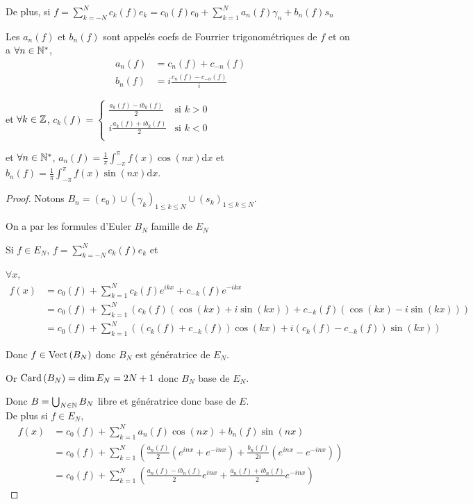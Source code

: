 De plus, si $\displaystyle f = \sum_{k = -N }^{N } c_k(f) e_k = c_0(f)e_0 + \sum_{k=1}^N a_n(f) \gamma_n + b_n(f) s_n$

Les $a_n(f)$ et $b_n(f)$ sont appelés coefs de Fourrier trigonométriques de $f$ et on a 
$\forall n \in \mathbb{N}^*$,
\begin{align}
    a_n(f) & = c_n(f) + c_{-n}(f) \\
    b_n(f) & = i \frac{c_n(f) - c_{-n}(f)} i
\end{align}

et $\forall k \in \mathbb{Z}$, $c_k(f) = \left\{ \begin{matrix}
    \frac{a_k(f) - ib_k(f)}{2} & \text{si } k > 0 \\
    i \frac{a_k(f) + ib_k(f) }{2 } & \text{si } k < 0 \\
\end{matrix} \right.$

et $\forall n \in \mathbb{N}^*$, $a_n(f) = \frac 1 \pi \int_{- \pi }^\pi f(x) \cos(nx) \mathrm{d}x$ et
$b_n(f) = \frac 1 \pi \int_{- \pi }^\pi f(x) \sin(nx) \mathrm{d}x$.

\begin{proof}
    Notons $B_n = (e_0) \cup (\gamma_k)_{1 \leqslant k \leqslant N} \cup (s_k)_{1 \leqslant k \leqslant N}$.

    On a par les formules d'Euler $B_N$ famille de $E_N$

    Si $f \in E_N$, $f = \sum_{k=-N}^N c_k(f) e_k$ et 

    $\forall x , $
    \begin{align}
            f(x) & = c_0(f) + \sum_{k=1}^N c_k(f) e^{ikx} + c_{-k}(f) e^{-ikx} \\
            & = c_0(f) + \sum_{k=1}^N \left( c_k(f) (\cos(kx) + i \sin(kx)) + c_{-k}(f) (\cos(kx) - i \sin(kx)) \right) \\
            & = c_0(f) + \sum_{k=1}^N \left( (c_k(f) + c_{-k}(f)) \cos(kx) + i (c_k(f) - c_{-k}(f)) \sin(kx) \right)
    \end{align}

    Donc $f \in \operatorname{Vect} \, (B_N)$ donc $B_N$ est génératrice de $E_N$.

    Or $\operatorname{Card} \, (B_N) = \dim E_N = 2N + 1$ donc $B_N$ base de $E_N$.

    Donc $B = \bigcup_{N \in \mathbb{N}} B_N$ libre et génératrice donc base de $E$.\\
    De plus si $f \in E_N$, 
    \begin{align}
        f(x) & = c_0(f) + \sum_{k=1}^N a_n(f) \cos(nx) + b_n(f) \sin(nx) \\
        & = c_0(f) + \sum_{k=1}^N \left( \frac{a_n(f)}{2} (e^{inx} + e^{-inx}) + \frac{b_n(f)}{2i} (e^{inx} - e^{-inx}) \right) \\
        & = c_0(f) + \sum_{k=1}^N \left( \frac{a_n(f) - i b_n(f)}{2 } e^{inx} + \frac{a_n(f) + i b_n(f)}{2 } e^{-inx} \right)
    \end{align}
\end{proof}

